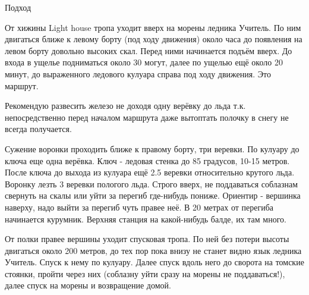 Подход

От хижины Light house тропа уходит вверх на морены ледника Учитель. По
ним двигаться ближе к левому борту (под ходу движения) около часа до
появления на левом борту довольно высоких скал. Перед ними начинается
подъём вверх. До входа в ущелье подниматься около 30 могут, далее по
ущелью ещё около 20 минут, до выраженного ледового кулуара справа под
ходу движения. Это маршрут.

Рекомендую развесить железо не доходя одну верёвку до льда т.к.
непосредственно перед началом маршрута даже вытоптать полочку в снегу
не всегда получается.

Сужение воронки проходить ближе к правому борту, три веревки. По
кулуару до ключа еще одна верёвка. Ключ - ледовая стенка до 85
градусов, 10-15 метров. После ключа до выхода из кулуара ещё 2.5
веревки относительно крутого льда. Воронку лезть 3 веревки пологого
льда. Строго вверх, не поддаваться соблазнам свернуть на скалы или
уйти за перегиб где-нибудь пониже. Ориентир - вершинка наверху, надо
выйти за перегиб чуть правее неё. В 20 метрах от перегиба начинается
курумник. Верхняя станция на какой-нибудь балде, их там много.

От полки правее вершины уходит спусковая тропа. По ней без потери
высоты двигаться около 200 метров, до тех пор пока внизу не станет
видно язык ледника Учитель. Спуск к нему по кулуару. Далее спуск вдоль
него до сворота на томские стоянки, пройти через них (соблазну уйти
сразу на морены не поддаваться!), далее спуск на морены и возвращение
домой.
